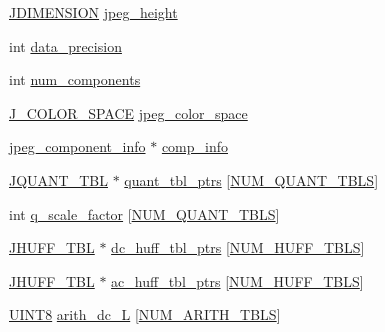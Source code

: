 \begin{DoxyCompactItemize}
\item 
\hyperlink{jmorecfg_8h_a04ed4674f6f1d0d50ec241531e38274f}{J\+D\+I\+M\+E\+N\+S\+I\+O\+N} \hyperlink{structjpeg__compress__struct_abc2cf065c0faab28327f7238949f76d3}{jpeg\+\_\+height}
\item 
int \hyperlink{structjpeg__compress__struct_a64c5b59e436f7d3d1d38b58d49993469}{data\+\_\+precision}
\item 
int \hyperlink{structjpeg__compress__struct_a524f0284a6fcf96b21c8a745282c15e2}{num\+\_\+components}
\item 
\hyperlink{jpeglib_8h_a6ea40239360b06efe6377f125f1134f3}{J\+\_\+\+C\+O\+L\+O\+R\+\_\+\+S\+P\+A\+C\+E} \hyperlink{structjpeg__compress__struct_a7fb5305ec135340eddc2ebabec6a84d7}{jpeg\+\_\+color\+\_\+space}
\item 
\hyperlink{structjpeg__component__info}{jpeg\+\_\+component\+\_\+info} $\ast$ \hyperlink{structjpeg__compress__struct_a4d37d3f336cc11acafef541bf8ed38cc}{comp\+\_\+info}
\item 
\hyperlink{structJQUANT__TBL}{J\+Q\+U\+A\+N\+T\+\_\+\+T\+B\+L} $\ast$ \hyperlink{structjpeg__compress__struct_a70a194c6a9c1744e1ed3a97232fb97f5}{quant\+\_\+tbl\+\_\+ptrs} \mbox{[}\hyperlink{jpeglib_8h_ab3254a23612ea48615001fffc0c9f691}{N\+U\+M\+\_\+\+Q\+U\+A\+N\+T\+\_\+\+T\+B\+L\+S}\mbox{]}
\item 
int \hyperlink{structjpeg__compress__struct_a3d8545504353556fae60e1e865d2c600}{q\+\_\+scale\+\_\+factor} \mbox{[}\hyperlink{jpeglib_8h_ab3254a23612ea48615001fffc0c9f691}{N\+U\+M\+\_\+\+Q\+U\+A\+N\+T\+\_\+\+T\+B\+L\+S}\mbox{]}
\item 
\hyperlink{structJHUFF__TBL}{J\+H\+U\+F\+F\+\_\+\+T\+B\+L} $\ast$ \hyperlink{structjpeg__compress__struct_a6a69e90a68e1f7f46774d83ba3737a4e}{dc\+\_\+huff\+\_\+tbl\+\_\+ptrs} \mbox{[}\hyperlink{jpeglib_8h_a6b12985705944e0623b671f29dc5722e}{N\+U\+M\+\_\+\+H\+U\+F\+F\+\_\+\+T\+B\+L\+S}\mbox{]}
\item 
\hyperlink{structJHUFF__TBL}{J\+H\+U\+F\+F\+\_\+\+T\+B\+L} $\ast$ \hyperlink{structjpeg__compress__struct_a98d33cae3c8eee8f1f8d662e31cb905d}{ac\+\_\+huff\+\_\+tbl\+\_\+ptrs} \mbox{[}\hyperlink{jpeglib_8h_a6b12985705944e0623b671f29dc5722e}{N\+U\+M\+\_\+\+H\+U\+F\+F\+\_\+\+T\+B\+L\+S}\mbox{]}
\item 
\hyperlink{jmorecfg_8h_adfb9a8ea1dd59f151065f763e1e9acd6}{U\+I\+N\+T8} \hyperlink{structjpeg__compress__struct_a736d867907116e88b3b38422fb2688c5}{arith\+\_\+dc\+\_\+\+L} \mbox{[}\hyperlink{jpeglib_8h_a4efb0fccc8d9db72ca18f32a26fad6ab}{N\+U\+M\+\_\+\+A\+R\+I\+T\+H\+\_\+\+T\+B\+L\+S}\mbox{]}

\end{DoxyCompactItemize}
